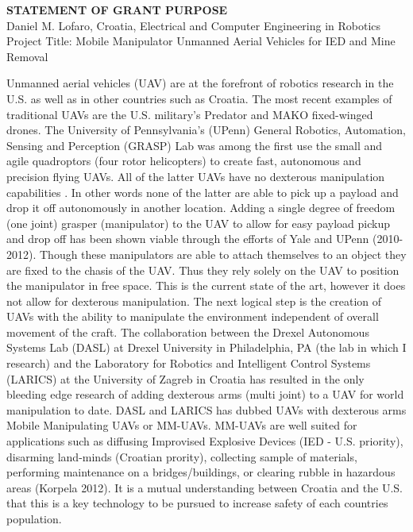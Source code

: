 \documentclass[12pt]{article}
\begin{document}
\begin{center}
\textbf{STATEMENT OF GRANT PURPOSE}\\
Daniel M. Lofaro, Croatia, Electrical and Computer Engineering in Robotics\\
Project Title: Mobile Manipulator Unmanned Aerial Vehicles for IED and Mine Removal\\

\end{center}

Unmanned aerial vehicles (UAV) are at the forefront of robotics research in the U.S. as well as in other countries such as Croatia.  
The most recent examples of traditional UAVs are the U.S. military's Predator and MAKO fixed-winged drones.  
The University of Pennsylvania's (UPenn) General Robotics, Automation, Sensing and Perception (GRASP) Lab was among the first use the small and agile quadroptors (four rotor helicopters) to create fast, autonomous and precision flying UAVs.  
All of the latter UAVs have no dexterous manipulation capabilities .
In other words none of the latter are able to pick up a payload and drop it off autonomously in another location.
Adding a single degree of freedom (one joint) grasper (manipulator) to the UAV to allow for easy payload pickup and drop off has been shown viable through the efforts of Yale and UPenn (2010-2012). 
Though these manipulators are able to attach themselves to an object they are fixed to the chasis of the UAV.
Thus they rely solely on the UAV to position the manipulator in free space.  
This is the current state of the art, however it does not allow for dexterous manipulation.  
The next logical step is the creation of UAVs with the ability to manipulate the environment independent of overall movement of the craft.  
The collaboration between the Drexel Autonomous Systems Lab (DASL) at Drexel University in Philadelphia, PA (the lab in which I research) and the Laboratory for Robotics and Intelligent Control Systems (LARICS) at the University of Zagreb in Croatia has resulted in the only bleeding edge research of adding dexterous arms (multi joint) to a UAV for world manipulation to date.  DASL and LARICS has dubbed UAVs with dexterous arms Mobile Manipulating UAVs or MM-UAVs. 
MM-UAVs are well suited for applications such as diffusing Improvised Explosive Devices (IED - U.S. priority), disarming land-minds (Croatian prority), collecting sample of materials, performing maintenance on a bridges/buildings, or clearing rubble in hazardous areas (Korpela 2012).  
It is a mutual understanding between Croatia and the U.S. that this is a key technology to be pursued to increase safety of each countries population.
\end{document}
